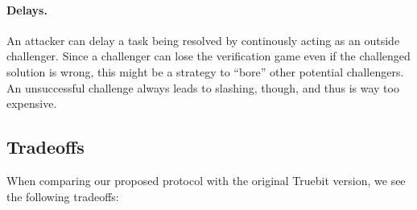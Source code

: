 \documentclass[a4paper]{article}
\begin{document}
\paragraph{Delays.}
An attacker can delay a task being resolved by continously acting as an outside challenger.
Since a challenger can lose the verification game even if the challenged solution is wrong,
this might be a strategy to ``bore'' other potential challengers. An unsuccessful challenge
always leads to slashing, though, and thus is way too expensive.

\subsection{Tradeoffs}
When comparing our proposed protocol with the original Truebit version, we see the following tradeoffs:
\end{document}
